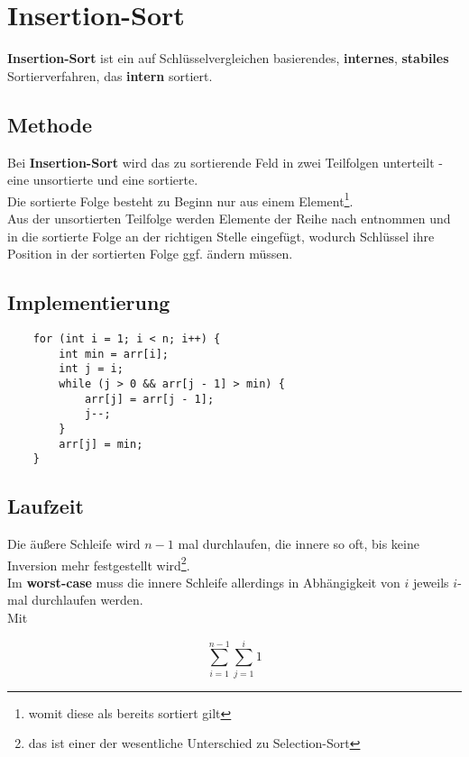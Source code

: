 \section{Insertion-Sort}

\textbf{Insertion-Sort} ist ein auf Schlüsselvergleichen basierendes, \textbf{internes}, \textbf{stabiles} Sortierverfahren, das \textbf{intern} sortiert.

\subsection{Methode}

Bei \textbf{Insertion-Sort} wird das zu sortierende Feld in zwei Teilfolgen unterteilt - eine unsortierte und eine sortierte.\\
Die sortierte Folge besteht zu Beginn nur aus einem Element\footnote{womit diese als bereits sortiert gilt}.\\
Aus der unsortierten Teilfolge werden Elemente der Reihe nach entnommen und in die sortierte Folge an der richtigen Stelle eingefügt, wodurch Schlüssel ihre Position in der sortierten Folge ggf. ändern müssen.

\subsection{Implementierung}

\begin{verbatim}
    for (int i = 1; i < n; i++) {
        int min = arr[i];
        int j = i;
        while (j > 0 && arr[j - 1] > min) {
            arr[j] = arr[j - 1];
            j--;
        }
        arr[j] = min;
    }
\end{verbatim}

\subsection{Laufzeit}
Die äußere Schleife wird $n-1$ mal durchlaufen, die innere so oft, bis keine Inversion mehr festgestellt wird\footnote{
    das ist einer der wesentliche Unterschied zu Selection-Sort
}.\\
Im \textbf{worst-case} muss die innere Schleife allerdings in Abhängigkeit von $i$ jeweils $i$-mal durchlaufen werden.\\

Mit

\begin{equation}
    \sum_{i = 1}^{n-1} \sum_{j=1}^i 1
\end{equation}

